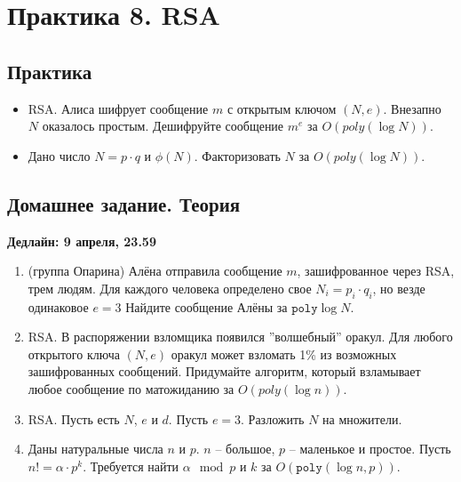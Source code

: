 \section{Практика 8. RSA}

\subsection{Практика}

\begin{itemize}

  \item RSA. Алиса шифрует сообщение $m$ с открытым ключом $(N, e)$. Внезапно 
$N$ оказалось простым. Дешифруйте сообщение $m^e$ за $O(poly(\log N))$.

  \item Дано число $N = p \cdot q$ и $\phi(N)$. Факторизовать $N$ за 
  $O(poly(\log N))$.


\end{itemize}

\subsection{Домашнее задание. Теория}
\textbf{Дедлайн: 9 апреля, 23.59}

\begin{enumerate}

  \item (группа Опарина) Алёна отправила сообщение $m$, зашифрованное через RSA, трем людям. 
  Для каждого человека
  определено свое $N_i = p_i \cdot q_i$, но везде одинаковое $e = 3$
  Найдите сообщение Алёны за $\texttt{poly} \log N$. 

  \item RSA. В распоряжении взломщика появился ''волшебный'' оракул. Для любого 
  открытого ключа $(N, e)$ оракул
  может взломать 1\% из возможных зашифрованных сообщений. Придумайте алгоритм, 
  который взламывает любое сообщение по матожиданию за $O(poly(\log n))$.

  \item RSA. Пусть есть $N$, $e$ и $d$. Пусть $e = 3$. Разложить $N$ на 
  множители.

  \item Даны натуральные числа $n$ и $p$. $n$ -- большое, $p$ -- маленькое и 
  простое. Пусть $n! = \alpha \cdot p^k$. Требуется найти $\alpha \mod p$ и $k$
  за $O(\texttt{poly}(\log n, p))$.




\end{enumerate}



\clearpage
